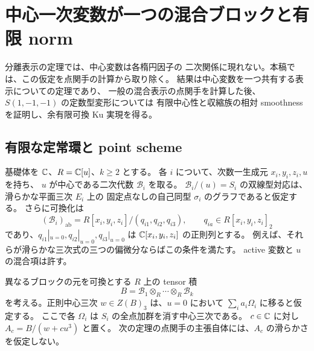 \section{中心一次変数が一つの混合ブロックと有限 norm}
\label{cmo:sec:points}

分離表示の定理では、中心変数は各楕円因子の
二次関係に現れない。本稿では、この仮定を点関手の計算から取り除く。
結果は中心変数を一つ共有する表示についての定理であり、
一般の混合表示の点関手を計算した後、$S(1,-1,-1)$ の定数型変形については
有限中心性と収縮族の相対 smoothness を証明し、余有限可換 Ku 実現を得る。

\subsection{有限な定常環と point scheme}

基礎体を $\mathbb C$、$R=\mathbb C[u]$、$k\geq2$ とする。
各 $i$ について、次数一生成元 $x_i,y_i,z_i,u$ を持ち、
$u$ が中心である二次代数 $\mathcal B_i$ を取る。
$\mathcal B_i/(u)=S_i$ の双線型対応は、滑らかな平面三次 $E_i$ 上の
固定点なしの自己同型 $\sigma_i$ のグラフであると仮定する。
さらに可換化は
\begin{equation}\label{cmo:eq:abelian}
 (\mathcal B_i)_{\mathrm{ab}}
   =R[x_i,y_i,z_i]/(q_{i1},q_{i2},q_{i3}),\qquad
 q_{ia}\in R[x_i,y_i,z_i]_2
\end{equation}
であり、$q_{i1}|_{u=0},q_{i2}|_{u=0},q_{i3}|_{u=0}$ は
$\mathbb C[x_i,y_i,z_i]$ の正則列とする。
例えば、それらが滑らかな三次式の三つの偏微分ならばこの条件を満たす。
active 変数と $u$ の混合項は許す。

異なるブロックの元を可換とする $R$ 上の tensor 積
\[
 B=\mathcal B_1\otimes_R\cdots\otimes_R\mathcal B_k
\]
を考える。正則中心三次 $w\in Z(B)_3$ は、$u=0$ において
$\sum_i a_i\Omega_i$ に移ると仮定する。
ここで各 $\Omega_i$ は $S_i$ の全点加群を消す中心三次である。
$c\in\mathbb C$ に対し $A_c=B/(w+cu^3)$ と置く。
次の定理の点関手の主張自体には、$A_c$ の滑らかさを仮定しない。

